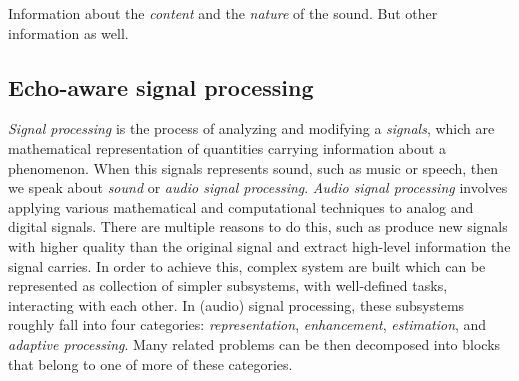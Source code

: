 Information about the \textit{content} and the \textit{nature} of the sound.
But other information as well.



\subsection{Echo-aware signal processing}
\textit{Signal processing} is the process of analyzing and modifying a \textit{signals}, which are mathematical representation of quantities carrying information about a phenomenon.
When this signals represents sound, such as music or speech, then we speak about \textit{sound} or \textit{audio signal processing}.
\textit{Audio signal processing} involves applying various mathematical and computational techniques to analog and digital signals.
There are multiple reasons to do this, such as produce new signals with higher quality than the original signal and extract high-level information the signal carries.
In order to achieve this, complex system are built which can be represented as collection of simpler subsystems, with well-defined tasks, interacting with each other.
In (audio) signal processing, these subsystems roughly fall into four categories: \textit{representation}, \textit{enhancement}, \textit{estimation}, and \textit{adaptive processing}.
Many related problems can be then decomposed into blocks that belong to one of more of these categories.

